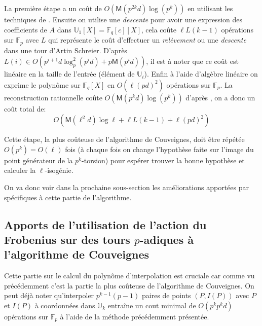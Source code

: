 \documentclass[10pt,a4paper]{book}
\theoremstyle{plain}
\theoremstyle{definition}
\theoremstyle{definition}
\theoremstyle{definition}
\theoremstyle{definition}
\theoremstyle{remark}
\theoremstyle{remark}
\begin{document}
La première étape a un coût de $O(\mathsf{M}(p^{2k}d)\log(p^{k}))$ en utilisant les techniques de \cite[§10.2]{vzGJG03}. Ensuite on utilise une \emph{descente} pour avoir une expression des coefficients de $A$ dans $\mathbb{U}_1[X]=\mathbb{F}_q[c][X]$, cela coûte $\ell L(k-1)$ opérations sur $\mathbb{F}_p$ avec $L$ qui représente le coût d'effectuer un \emph{relèvement} ou une \emph{descente} dans une tour d'Artin Schreier. D'après \cite[Theorem 13]{DeFeo-Shost'12} $L(i) \in O(p^{i+1}d \log^2_p(p^id)+p \mathsf{M}(p^id))$, il est à noter que ce coût est linéaire en la taille de l'entrée (élément de $\mathbb{U}_i$). Enfin à l'aide d'algèbre linéaire on exprime le polynôme sur $\mathbb{F}_q[X]$ en $O(\ell(pd)^2)$ opérations sur $\mathbb{F}_p$. La reconstruction rationnelle coûte $O(\mathsf{M}(p^kd)\log(p^k))$ d'après \cite[§11.1]{vzGJG03}, on a donc un coût total de:
\begin{equation*}
O(\mathsf{M}(\ell^2d)\log \ell + \ell L(k-1) + \ell(pd)^2)
\end{equation*}

Cette étape, la plus coûteuse de l'algorithme de Couveignes, doit être répétée $O(p^k)=O(\ell)$ fois (à chaque fois on change l'hypothèse faite sur l'image du point générateur de la $p^k$-torsion) pour espérer trouver la bonne hypothèse et calculer la $\ell$-isogénie.

On va donc voir dans la prochaine sous-section les améliorations apportées par \cite{DeFeo11} spécifiques à cette partie de l'algorithme.

\subsection{Apports de l'utilisation de l'action du Frobenius sur des tours $p$-adiques à l'algorithme de Couveignes}

Cette partie sur le calcul du polynôme d'interpolation est cruciale car comme vu précédemment c'est la partie la plus coûteuse de l'algorithme de Couveignes. On peut déjà noter qu'interpoler $p^{k-1}(p-1)$ paires de points $(P,I(P))$ avec $P$ et $I(P)$ à coordonnées dans $\mathbb{U}_k$ entraîne un cout minimal de $O(p^k p^kd)$ opérations sur $\mathbb{F}_p$ à l'aide de la méthode précédemment présentée. 
\end{document}

